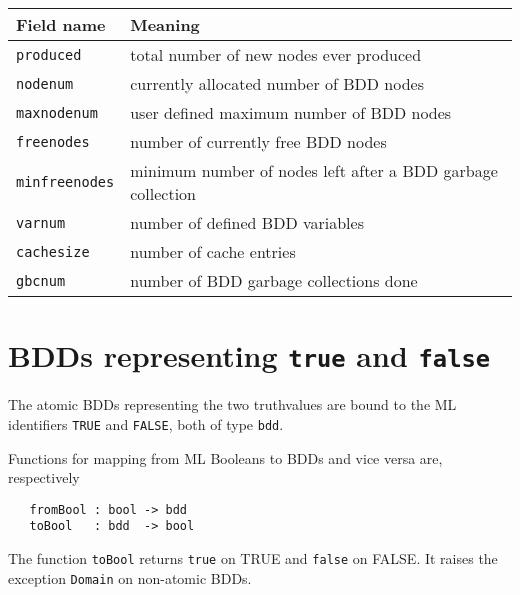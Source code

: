 \documentclass[12pt]{article}
\newcommand{\bnind}[1]{\index[MLbn]{#1}}
\renewcommand{\t}[1]{\mbox{\tt #1}}
\newcommand{\ty}[1]{\mbox{\tt #1}}
\newcommand{\ml}[1]{{\tt #1}}
\newcommand\fun{\mbox{\tt{->}}}
\begin{document}
\medskip

\begin{tabular}{|l|l|} \hline
{\bf{Field name}}& {\bf{Meaning}}                                              \\ \hline\hline
\t{produced}     & total number of new nodes ever produced                     \\ \hline
\t{nodenum}      & currently allocated number of BDD nodes                     \\ \hline
\t{maxnodenum}   & user defined maximum number of BDD nodes                    \\ \hline
\t{freenodes}    & number of currently free BDD nodes                          \\ \hline
\t{minfreenodes} & minimum number of nodes left after a BDD garbage collection \\ \hline
\t{varnum}       & number of defined BDD variables                             \\ \hline
\t{cachesize}    & number of cache entries                                     \\ \hline
\t{gbcnum}       & number of BDD garbage collections done                      \\ \hline
\end{tabular}

\medskip

\section{BDDs representing {\t{true}} and {\t{false}}}

The atomic BDDs representing the two truthvalues are bound to the ML
identifiers \t{TRUE} and \t{FALSE}, both of type \t{bdd}.

Functions for mapping from ML Booleans to BDDs and vice versa are, respectively

%
%

\begin{verbatim}
   fromBool : bool -> bdd
   toBool   : bdd  -> bool
\end{verbatim}\bnind{\ml{fromBool}}\bnind{\ml{toBool}}

The function \t{toBool} returns \t{true} on TRUE and \t{false} on FALSE.
It raises the exception \t{Domain} on non-atomic BDDs.
\end{document}
